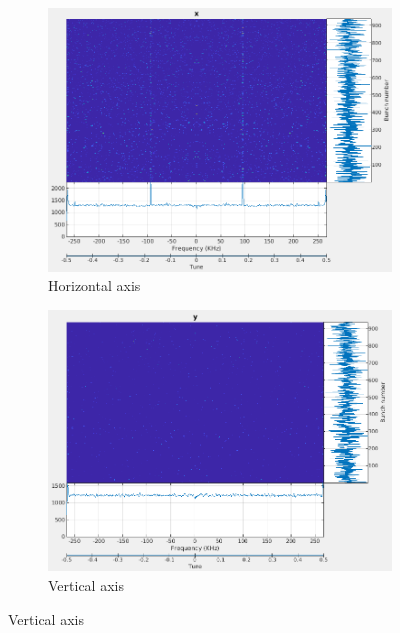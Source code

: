 \documentclass{report}
\begin{document}
 \begin{figure}[hbt]
   \centering
    \begin{subfigure}[b]{0.45\textwidth}
        \includegraphics[width=\textwidth]{vlr_spectrum_x.png}
        \caption{Horizontal axis}
        \label{fig:spectrum_example_x}
    \end{subfigure}
    \begin{subfigure}[b]{0.45\textwidth}
        \includegraphics[width=\textwidth]{vlr_spectrum_y.png}
        \caption{Vertical axis}
        \label{fig:spectrum_example_y}
    \end{subfigure}
    

\end{figure}
\end{document}
